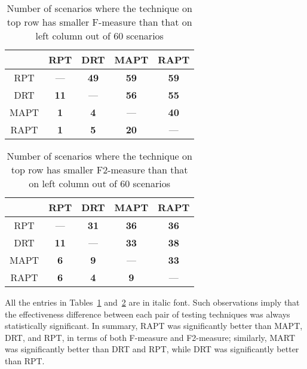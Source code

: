 \documentclass[10pt,journal,compsoc]{IEEEtran}
\begin{document}
\begin{table}
\caption{Number of scenarios where the technique on top row has smaller F-measure than that on left column out of 60 scenarios}
\label{tab:Fsta}
\centering
\begin{tabular}{|c|c|c|c|c|} \hline
			& RPT					& DRT					& MAPT				& RAPT				\\ \hline
RPT		& ---					& \textbf{49}	& \textbf{59}	& \textbf{59}	\\ \hline
DRT		& \textbf{11}	& ---					& \textbf{56}	& \textbf{55}	\\ \hline
MAPT	& \textbf{1}	& \textbf{4}	& ---					& \textbf{40}	\\ \hline
RAPT	& \textbf{1}	& \textbf{5}	& \textbf{20}	& ---					\\ \hline
\end{tabular}
\end{table}

\begin{table}
\caption{Number of scenarios where the technique on top row has smaller F2-measure than that on left column out of 60 scenarios}
\label{tab:F2sta}
\centering
\begin{tabular}{|c|c|c|c|c|} \hline
			& RPT					& DRT					& MAPT				& RAPT				\\ \hline
RPT		& ---					& \textbf{31}	& \textbf{36}	& \textbf{36}	\\ \hline
DRT		& \textbf{11}	& ---					& \textbf{33}	& \textbf{38}	\\ \hline
MAPT	& \textbf{6}	& \textbf{9}	& ---					& \textbf{33}	\\ \hline
RAPT	& \textbf{6}	& \textbf{4}	& \textbf{9}	& ---					\\ \hline
\end{tabular}
\end{table}

All the entries in Tables~\ref{tab:Fsta} and~\ref{tab:F2sta} are in italic font. Such observations imply that the effectiveness difference between each pair of testing techniques was always statistically significant. In summary, RAPT was significantly better than MAPT, DRT, and RPT, in terms of both F-measure and F2-measure; similarly, MART was significantly better than DRT and RPT, while DRT was significantly better than RPT.
\end{document}

